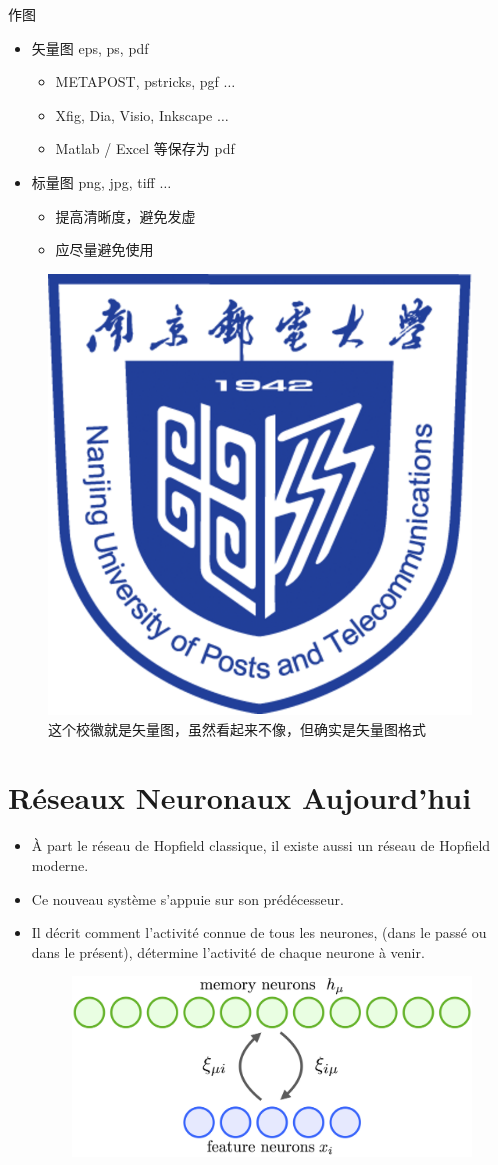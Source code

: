 \documentclass{beamer}
\begin{document}
\begin{frame}{作图}
    \begin{itemize}
        \item 矢量图 eps, ps, pdf
        \begin{itemize}
            \item METAPOST, pstricks, pgf $\ldots$
            \item Xfig, Dia, Visio, Inkscape $\ldots$
            \item Matlab / Excel 等保存为 pdf
        \end{itemize}
        \item 标量图 png, jpg, tiff $\ldots$
        \begin{itemize}
            \item 提高清晰度，避免发虚
            \item 应尽量避免使用
        \end{itemize}
    \end{itemize}
    \begin{figure}[htpb]
        \centering
        \includegraphics[width=0.2\linewidth]{pic/NJUPT_Logo.eps
        }
        \caption{这个校徽就是矢量图，虽然看起来不像，但确实是矢量图格式}
    \end{figure}
\end{frame}
\fi

\section{Réseaux Neuronaux Aujourd'hui}

\begin{frame}
    \begin{itemize}[<+-| alert@+>] %
        \item À part le réseau de Hopfield classique, il existe aussi un réseau de Hopfield moderne.
        \item Ce nouveau système s'appuie sur son prédécesseur.
        \item Il décrit comment l'activité connue de tous les neurones, (dans le passé ou dans le présent), détermine l'activité de chaque neurone à venir.
        \begin{figure}
            \centering
            \includegraphics[width=0.7\linewidth]{pic/Modern_Hopfield_Network.png}
        \end{figure}
    \end{itemize}
\end{frame}
\end{document}
